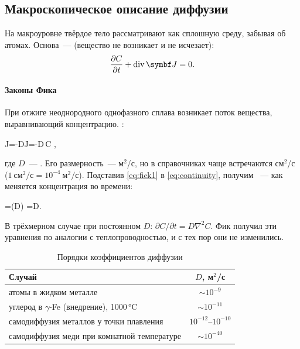 \subsection{Макроскопическое описание диффузии}\label{ssec:fick}

На макроуровне твёрдое тело рассматривают как сплошную среду, забывая
об атомах. Основа~—  (вещество не
возникает и не исчезает):
\begin{equation}\label{eq:continuity}
\frac{\partial C}{\partial t}+\operatorname{div}\vb J=0 .
\end{equation}

\paragraph{Законы Фика}
При отжиге неоднородного однофазного сплава возникает поток вещества,
выравнивающий концентрацию. :
\begin{keyeq}\label{eq:fick1}
J=-D\qquad{}\qquad \vb J=-D\,\nabla C ,
\end{keyeq}
где $D$~— . Его размерность~— м$^2$/с, но в
справочниках чаще встречаются см$^2$/с ($1~\text{см}^2/\text{с}=10^{-4}~\text{м}^2/\text{с}$).
Подставив \eqref{eq:fick1} в \eqref{eq:continuity}, получим
~— как меняется концентрация во времени:
\begin{keyeq}\label{eq:fick2}
=\left(D\right)
\quad{}\quad
{}=D.
\end{keyeq}
В трёхмерном случае при постоянном $D$: $\partial C/\partial t=D\nabla^2C$.
Фик получил эти уравнения по аналогии с теплопроводностью, и с тех пор
они не изменились.

\begin{table}[ht]
\centering
\caption{Порядки коэффициентов диффузии}
\label{tab:D-orders}
\small
\begin{tabular}{@{}lc@{}}
\toprule
Случай & $D$, м$^2$/с \\
\midrule
атомы в жидком металле & $\sim10^{-9}$ \\
углерод в $\gamma$-Fe (внедрение), 1000\,°C & $\sim10^{-11}$ \\
самодиффузия металлов у точки плавления & $10^{-12}$--$10^{-10}$ \\
самодиффузия меди при комнатной температуре & $\sim10^{-40}$ \\
\bottomrule
\end{tabular}
\end{table}

